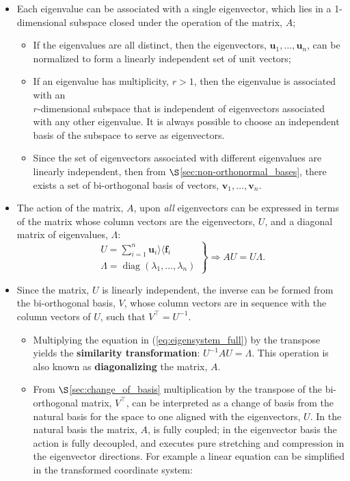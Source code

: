 \documentclass[12pt, twoside, draft]{article}
\begin{document}
\begin{itemize}[noitemsep]
\item Each eigenvalue can be associated with a single eigenvector, which lies in a 1-dimensional subspace closed under the operation of the matrix, $A$;
\begin{itemize}
\item If the eigenvalues are all distinct, then the eigenvectors, $\mathbf{u}_1, \ldots, \mathbf{u}_n$, can be normalized to form a linearly independent set of unit vectors;
\item If an eigenvalue has multiplicity, $r > 1$, then the eigenvalue is associated with an \\ $r$-dimensional subspace that is independent of eigenvectors associated with any other eigenvalue.  It is always possible to choose an independent basis of the subspace to serve as eigenvectors.
\item Since the set of eigenvectors associated with different eigenvalues are linearly independent, then from $\S$\ref{sec:non-orthonormal_bases}, there exists a set of bi-orthogonal basis of vectors, $\mathbf{v}_1, \ldots, \mathbf{v}_n$.  
\end{itemize}
\item The action of the matrix, $A$, upon \textit{all} eigenvectors can be expressed in terms of the matrix whose column vectors are the eigenvectors, $U$, and a diagonal matrix of eigenvalues, $\Lambda$:
\begin{equation}\label{eq:eigensystem_full}
\left.
\begin{array}{l}
U = \sum_{i=1}^n \mathbf{u}_i \rangle \langle \mathbf{f}_i \\
\Lambda = \operatorname{diag}(\lambda_1, \ldots, \lambda_n)
\end{array}
\right\}
\Rightarrow A U = U \Lambda.
\end{equation}
\item Since the matrix, $U$ is linearly independent, the inverse can be formed from the bi-orthogonal basis, $V$, whose column vectors are in sequence with the column vectors of $U$, such that $V^\top = U^{-1}$.
\begin{itemize}[noitemsep]
\item Multiplying the equation in (\ref{eq:eigensystem_full}) by the transpose yields the \textbf{similarity transformation}: $U^{-1} A U = \Lambda$.  This operation is also known as \textbf{diagonalizing} the matrix, $A$.
\item From $\S$\ref{sec:change_of_basis} multiplication by the transpose of the bi-orthogonal matrix, $V^\top$, can be interpreted as a change of basis from the natural basis for the space to one aligned with the eigenvectors, $U$. In the natural basis the matrix, $A$, is fully coupled; in the eigenvector basis the action is fully decoupled, and executes pure stretching and compression in the eigenvector directions. For example a linear equation can be simplified in the transformed coordinate system:
\end{itemize}
\end{itemize}
\end{document}
